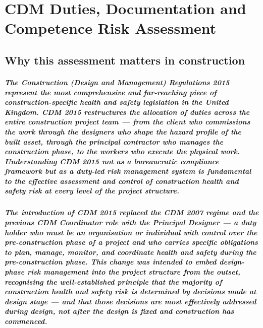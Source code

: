\chapter{CDM Duties, Documentation and Competence Risk Assessment}
\label{chap:CDM Duties, Documentation and Competence Risk Assessment}

\section{Why this assessment matters in construction}

\paragraph{The Construction (Design and Management) Regulations 2015 represent the most comprehensive and far-reaching piece of construction-specific health and safety legislation in the United Kingdom. CDM 2015 restructures the allocation of duties across the entire construction project team --- from the client who commissions the work through the designers who shape the hazard profile of the built asset, through the principal contractor who manages the construction phase, to the workers who execute the physical work. Understanding CDM 2015 not as a bureaucratic compliance framework but as a duty-led risk management system is fundamental to the effective assessment and control of construction health and safety risk at every level of the project structure.}

\paragraph{The introduction of CDM 2015 replaced the CDM 2007 regime and the previous CDM Coordinator role with the Principal Designer --- a duty holder who must be an organisation or individual with control over the pre-construction phase of a project and who carries specific obligations to plan, manage, monitor, and coordinate health and safety during the pre-construction phase. This change was intended to embed design-phase risk management into the project structure from the outset, recognising the well-established principle that the majority of construction health and safety risk is determined by decisions made at design stage --- and that those decisions are most effectively addressed during design, not after the design is fixed and construction has commenced.}

